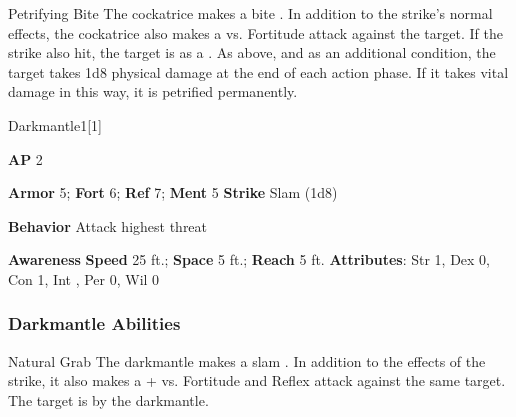 \begin{freeability}{Petrifying Bite}
The cockatrice makes a bite .
In addition to the strike's normal effects, the cockatrice also makes a  vs. Fortitude attack against the target.
\hit If the strike also hit, the target is  as a .
\crit As above, and as an additional condition, the target takes 1d8 physical damage at the end of each action phase.
If it takes vital damage in this way, it is petrified permanently.
\end{freeability}

\begin{monsection}{Darkmantle}{1}[1]
\vspace{-1em}\vspace{-1em}
\begin{spellcontent}
\begin{spelltargetinginfo}
{\textbf{AP} 2}

\pari \textbf{Armor} 5;
\textbf{Fort} 6;
\textbf{Ref} 7;
\textbf{Ment} 5
\pari \textbf{Strike} Slam  (1d8)



\pari \textbf{Behavior} Attack highest threat
\end{spelltargetinginfo}
\end{spellcontent}

\begin{monsterfooter}
\pari \textbf{Awareness} 
\pari \textbf{Speed} 25 ft.;
\textbf{Space} 5 ft.;
\textbf{Reach} 5 ft.
\pari \textbf{Attributes}:
Str 1,
Dex 0,
Con 1,
Int ,
Per 0,
Wil 0
\end{monsterfooter}
\end{monsection}


\subsubsection{Darkmantle Abilities}

\begin{freeability}{Natural Grab}
The darkmantle makes a slam .
In addition to the effects of the strike, it also makes a + vs. Fortitude and Reflex attack against the same target.
\hit The target is  by the darkmantle.
\end{freeability}

